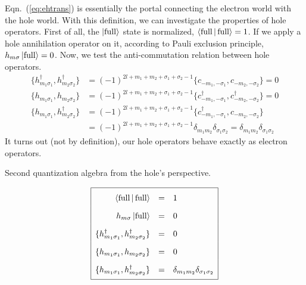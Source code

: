Eqn.~(\ref{eq:ehtrans}) is essentially the portal connecting the electron world with
the hole world. With this definition, we can investigate the properties of hole
operators. First of all, the $\Ket{\text{full}}$ state is normalized,
$\Braket{\text{full}|\text{full}}=1$. If we apply a hole annihilation operator
on it, according to Pauli exclusion principle, $h_{m\sigma}\Ket{\text{full}}=0$.
Now, we test the anti-commutation relation between hole operators.
\begin{align}
\{ h_{m_1\sigma_1}^\dagger, h_{m_2\sigma_2}^\dagger \}
& = (-1)^{2l+m_1+m_2+\sigma_1+\sigma_2-1} \{ c_{-m_1,-\sigma_1}, c_{-m_2,-\sigma_2} \} = 0 \\
\{ h_{m_1\sigma_1}, h_{m_2\sigma_2} \}
& = (-1)^{2l+m_1+m_2+\sigma_1+\sigma_2-1} \{ c_{-m_1,-\sigma_1}^\dagger, c_{-m_2,-\sigma_2}^\dagger \} = 0 \\
\{ h_{m_1\sigma_1}, h_{m_2\sigma_2}^\dagger \}
& = (-1)^{2l+m_1+m_2+\sigma_1+\sigma_2-1} \{ c_{-m_1,-\sigma_1}^\dagger, c_{-m_2,-\sigma_2} \} \nonumber \\
& = (-1)^{2l+m_1+m_2+\sigma_1+\sigma_2-1} \delta_{m_1m_2} \delta_{\sigma_1\sigma_2}
= \delta_{m_1m_2} \delta_{\sigma_1\sigma_2}
\end{align}
%
It turns out (not by definition), our hole operators behave exactly as electron
operators.
\begin{table}[h!]
\caption{Second quantization algebra from the hole's perspective.}
\label{table:secondQhole}
\begin{equation*}
\renewcommand\arraystretch{1.8}
\begin{array}{|>{\displaystyle}r >{\displaystyle}c >{\displaystyle}l|}
  \hline
  \Braket{\text{full}|\text{full}} & = & 1 \\
  h_{m\sigma}\Ket{\text{full}} & = & 0 \\
  \{h_{m_1\sigma_1}^\dagger, h_{m_2\sigma_2}^\dagger\} & = & 0 \\
  \{h_{m_1\sigma_1}, h_{m_2\sigma_2}\} & = & 0 \\
  \{h_{m_1\sigma_1}, h_{m_2\sigma_2}^\dagger\} & = & \delta_{m_1m_2} \delta_{\sigma_1\sigma_2} \\[0.2em]
  \hline
\end{array}
\end{equation*}
\end{table}


